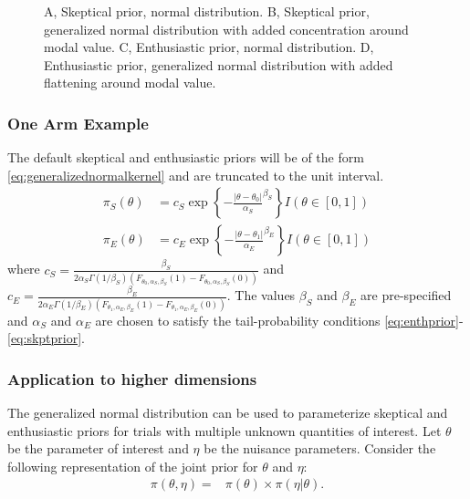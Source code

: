 \documentclass[12pt]{article}
\begin{document}
\begin{figure}
\begin{center}
\caption{A, Skeptical prior, normal distribution. B, Skeptical prior, generalized normal distribution with added concentration around modal value. C, Enthusiastic prior, normal distribution. D, Enthusiastic prior, generalized normal distribution with added flattening around modal value.}
\label{fig:figure1}
\end{center}\end{figure}
\subsubsection{One Arm Example}
The default skeptical and enthusiastic priors will be of the form \eqref{eq:generalizednormalkernel} and are truncated to the unit interval. 
\begin{align}
\pi_S(\theta)&=c_S \exp\left\{-\frac{|\theta-\theta_0|}{\alpha_S}^{\beta_S}\right\}{I(\theta\in[0,1])} \label{eq:ex1skptprior}\\
\pi_E(\theta)&=c_E\exp\left\{-\frac{|\theta-\theta_1|}{\alpha_E}^{\beta_E}\right\}{I(\theta\in[0,1])}\label{eq:ex1enthprior}
\end{align}
where $c_S=\frac{\beta_S}{2\alpha_S \Gamma(1/\beta_S)({F_{\theta_0,\alpha_S,\beta_S}(1)-F_{\theta_0,\alpha_S,\beta_S}(0)})}$ and $c_E=\frac{\beta_E}{2\alpha_E \Gamma(1/\beta_E)({F_{\theta_1,\alpha_E,\beta_E}(1)-F_{\theta_1,\alpha_E,\beta_E}(0)})}$. The values $\beta_S$ and $\beta_E$ are pre-specified and $\alpha_S$ and $\alpha_E$ are chosen to satisfy the tail-probability conditions 
\eqref{eq:enthprior}-\eqref{eq:skptprior}.
\subsubsection{Application to higher dimensions}

The generalized normal distribution can be used to parameterize skeptical and enthusiastic priors for trials with multiple unknown quantities of interest. Let $\theta$ be the parameter of interest and $\eta$ be the nuisance parameters. Consider the following representation of the joint prior for $\theta$ and $\eta$:
\begin{align}
\pi(\theta,\eta)=&\pi(\theta)\times\pi(\eta|\theta). \label{eq:generalized_normal_joint}
\end{align}
\end{document}
